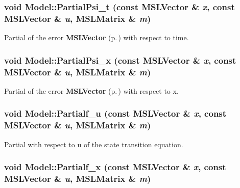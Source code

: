 \subsubsection{\setlength{\rightskip}{0pt plus 5cm}void Model::Partial\-Psi\_\-t (const {\bf MSLVector} \& {\em x}, const {\bf MSLVector} \& {\em u}, {\bf MSLMatrix} \& {\em m})\hspace{0.3cm}{\tt  [inline, virtual]}}\label{classModel_a20}


Partial of the error {\bf MSLVector} {\rm (p.\,\pageref{classMSLVector})} with respect to time.

\subsubsection{\setlength{\rightskip}{0pt plus 5cm}void Model::Partial\-Psi\_\-x (const {\bf MSLVector} \& {\em x}, const {\bf MSLVector} \& {\em u}, {\bf MSLMatrix} \& {\em m})\hspace{0.3cm}{\tt  [inline, virtual]}}\label{classModel_a19}


Partial of the error {\bf MSLVector} {\rm (p.\,\pageref{classMSLVector})} with respect to x.

\subsubsection{\setlength{\rightskip}{0pt plus 5cm}void Model::Partialf\_\-u (const {\bf MSLVector} \& {\em x}, const {\bf MSLVector} \& {\em u}, {\bf MSLMatrix} \& {\em m})\hspace{0.3cm}{\tt  [inline, virtual]}}\label{classModel_a11}


Partial with respect to u of the state transition equation.

\subsubsection{\setlength{\rightskip}{0pt plus 5cm}void Model::Partialf\_\-x (const {\bf MSLVector} \& {\em x}, const {\bf MSLVector} \& {\em u}, {\bf MSLMatrix} \& {\em m})\hspace{0.3cm}{\tt  [inline, virtual]}}\label{classModel_a10}


